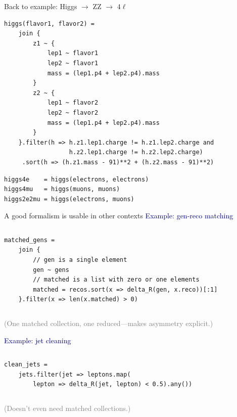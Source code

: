\documentclass[aspectratio=169]{beamer}
\begin{document}
\begin{frame}[fragile]{Back to example: Higgs $\to$ ZZ $\to$ $4\ell$}
\small
\begin{verbatim}
higgs(flavor1, flavor2) =
    join {
        z1 ~ {
            lep1 ~ flavor1
            lep2 ~ flavor1
            mass = (lep1.p4 + lep2.p4).mass
        }
        z2 ~ {
            lep1 ~ flavor2
            lep2 ~ flavor2
            mass = (lep1.p4 + lep2.p4).mass
        }
    }.filter(h => h.z1.lep1.charge != h.z1.lep2.charge and
                  h.z2.lep1.charge != h.z2.lep2.charge)
     .sort(h => (h.z1.mass - 91)**2 + (h.z2.mass - 91)**2)
\end{verbatim}
\begin{verbatim}
higgs4e    = higgs(electrons, electrons)
higgs4mu   = higgs(muons, muons)
higgs2e2mu = higgs(electrons, muons)
\end{verbatim}
\end{frame}

\begin{frame}[fragile]{A good formalism is usable in other contexts}
\small
\vspace{0.5 cm}
\textcolor{darkblue}{\large Example: gen-reco matching}

\vspace{-0.25 cm}
\begin{columns}
\begin{verbatim}
matched_gens =
    join {
        // gen is a single element
        gen ~ gens
        // matched is a list with zero or one elements
        matched = recos.sort(x => delta_R(gen, x.reco))[:1]
    }.filter(x => len(x.matched) > 0)
\end{verbatim}
\end{columns}

\vspace{0.25 cm}
\textcolor{gray}{\normalsize (One matched collection, one reduced---makes asymmetry explicit.)}

\vspace{0.65 cm}
\textcolor{darkblue}{\large Example: jet cleaning}

\vspace{-0.25 cm}
\begin{columns}
\begin{verbatim}
clean_jets =
    jets.filter(jet => leptons.map(
        lepton => delta_R(jet, lepton) < 0.5).any())
\end{verbatim}
\end{columns}

\vspace{0.25 cm}
\textcolor{gray}{\normalsize (Doesn't even need matched collections.)}
\end{frame}
\end{document}
